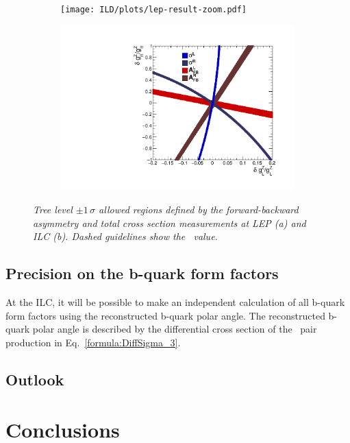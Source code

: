 \begin{figure}
	\centering
	\begin{subfigure}{0.5\textwidth}
		\texttt{[image: ILD/plots/lep-result-zoom.pdf]}
		\caption{\label{fig:LEPILCResult_a_3} }
	\end{subfigure}%
	\begin{subfigure}{0.5\textwidth}
		\centering
		\includegraphics[width=0.99\textwidth]{ILD/plots/ilc-result.pdf}
		\caption{\label{fig:LEPILCResult_b_3} }
	\end{subfigure}
	\caption{\sl Tree level $\pm 1\,\sigma$ allowed regions defined by the forward-backward asymmetry and total cross section measurements at LEP (a) and ILC (b). Dashed guidelines show the \sm\ value.}
	\label{fig:LEPILCResult_3}
\end{figure}
\subsection{Precision on the b-quark form factors}
At the ILC, it will be possible to make an independent calculation of all b-quark form factors using the reconstructed b-quark polar angle.
The reconstructed b-quark polar angle is described by the differential cross section of the \bbbar\ pair production in Eq.~\ref{formula:DiffSigma_3}.




\subsection{Outlook}
\section*{Conclusions}
